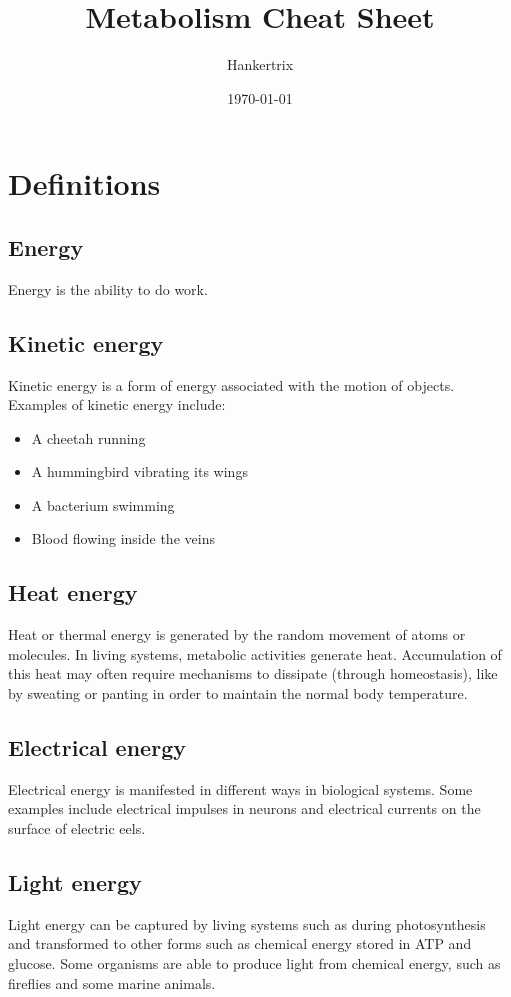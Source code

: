 \documentclass[11pt]{article}
\author{Hankertrix}
\date{\today}
\title{Metabolism Cheat Sheet}
\begin{document}
\maketitle
\setcounter{tocdepth}{2}
\tableofcontents \clearpage\newpage

\section{Definitions}
\label{sec:orgfdceb85}

\subsection{Energy}
\label{sec:orgc0c04cf}
Energy is the ability to do work.

\subsection{Kinetic energy}
\label{sec:org912cf38}
Kinetic energy is a form of energy associated with the motion of objects. Examples of kinetic energy include:
\begin{itemize}
\item A cheetah running
\item A hummingbird vibrating its wings
\item A bacterium swimming
\item Blood flowing inside the veins
\end{itemize}

\subsection{Heat energy}
\label{sec:org12a691c}
Heat or thermal energy is generated by the random movement of atoms or molecules. In living systems, metabolic activities generate heat. Accumulation of this heat may often require mechanisms to dissipate (through homeostasis), like by sweating or panting in order to maintain the normal body temperature.

\subsection{Electrical energy}
\label{sec:orgc500a69}
Electrical energy is manifested in different ways in biological systems. Some examples include electrical impulses in neurons and electrical currents on the surface of electric eels.

\subsection{Light energy}
\label{sec:org0d73ac1}
Light energy can be captured by living systems such as during photosynthesis and transformed to other forms such as chemical energy stored in ATP and glucose. Some organisms are able to produce light from chemical energy, such as fireflies and some marine animals.
\end{document}
